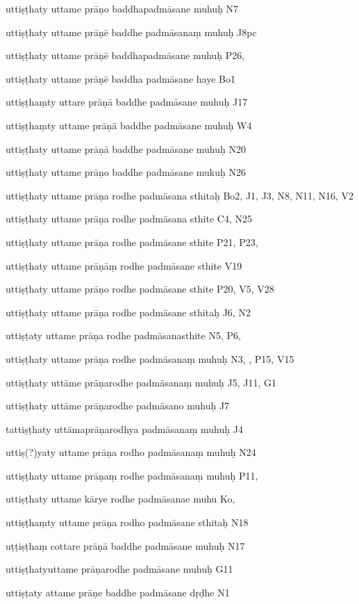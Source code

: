 \begin{marma}[hp02_009]
\begin{marma}[hp02_011]
\begin{marma}[hp02_012]
\item[uttiṣṭhaty uttame prāṇo baddhapadmāsane muhuḥ] N7
\item[uttiṣṭhaty uttame prāṇē baddhe padmāsanaṃ muhuḥ] J8pc
\item[uttiṣṭhaty uttame prāṇē baddhapadmāsane muhuḥ] P26, 
\item[uttiṣṭhaty uttame prāṇē baddha padmāsane haye] Bo1
\item[uttiṣṭhaṃty uttare prāṇā baddhe padmāsane muhuḥ] J17
\item[uttiṣṭhaṃty uttame prāṇā baddhe padmāsane muhuḥ] W4
\item[uttiṣṭhaty uttame prāṇā baddhe padmāsane muhuḥ] N20
\item[uttiṣṭhaty uttame prāṇo baddhe padmāsane mukuḥ] N26
\item[uttiṣṭhaty uttame prāṇa rodhe padmāsana sthitaḥ] Bo2, J1, J3, N8, N11, N16, V2
\item[uttiṣṭhaty uttame prāṇa rodhe padmāsana sthite] C4, N25
\item[uttiṣṭhaty uttame prāṇa rodhe padmāsane sthite] P21, P23, 
\item[uttiṣṭhaty uttame prāṇāṃ rodhe padmāsane sthite] V19
\item[uttiṣṭhaty uttame prāṇo rodhe padmāsane sthite] P20, V5, V28
\item[uttiṣṭhaty uttame prāṇa rodhe padmāsane sthitaḥ] J6, N2
\item[uttiṣṭaty uttame prāṇa rodhe padmāsanasthite]  N5, P6, 
\item[uttiṣṭhaty uttame prāṇa rodhe padmāsanaṃ muhuḥ] N3, , P15, V15
\item[uttiṣṭhaty uttāme prāṇarodhe padmāsanaṃ muhuḥ] J5, J11, G1
\item[uttiṣṭhaty uttāme prāṇarodhe padmāsano muhuḥ] J7
\item[tattiṣṭhaty uttāmaprāṇarodhya padmāsanaṃ muhuḥ] J4
\item[uttiṣ(?)yaty uttame prāṇa rodho padmāsanaṃ muhuḥ] N24
\item[uttiṣṭhaty uttame prāṇaṃ rodhe padmāsanaṃ muhuḥ] P11, 
\item[uttiṣṭhaty uttame kārye rodhe padmāsanae muhu] Ko,
\item[uttiṣṭhaṃty uttame prāṇa rodho padmāsane sthitaḥ] N18
\item[uṭṭiṣṭhaṃ cottare prāṇā baddhe padmāsane muhuḥ] N17
\item[uttiṣṭhatyuttame prāṇarodhe padmāsane muhuḥ] G11
\item[uttiṣṭaty attame prāṇe baddhe padmāsane dṛḍhe] N1

\end{marma}
\end{marma}
\end{marma}
